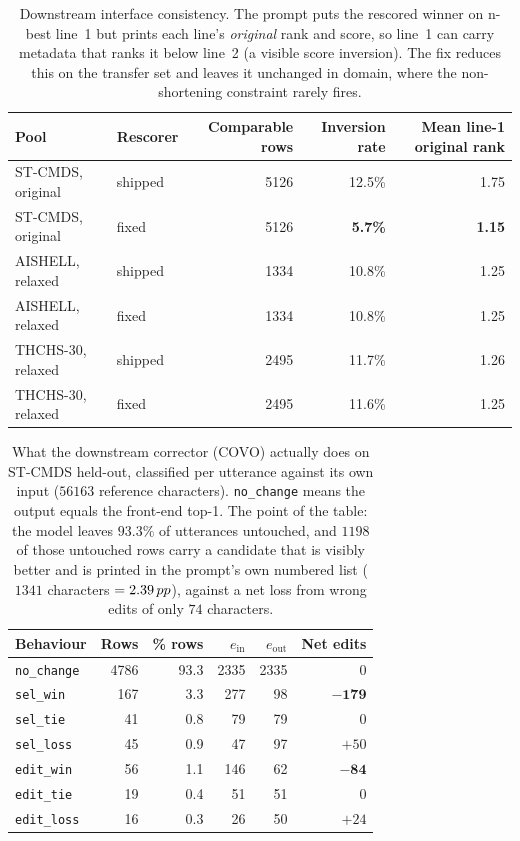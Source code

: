 \begin{table}[t]
\centering
\caption{Downstream interface consistency. The prompt puts the rescored winner
on n-best line~1 but prints each line's \emph{original} rank and score, so line~1
can carry metadata that ranks it below line~2 (a visible score inversion).
The fix reduces this on the transfer set and leaves it unchanged in domain,
where the non-shortening constraint rarely fires.}
\label{tab:interface}
\begin{tabular}{llrrr}
\toprule
Pool & Rescorer & Comparable rows & Inversion rate & Mean line-1 original rank \\
\midrule
ST-CMDS, original & shipped & 5126 & 12.5\% & 1.75 \\
ST-CMDS, original & fixed   & 5126 & \textbf{5.7\%} & \textbf{1.15} \\
AISHELL, relaxed  & shipped & 1334 & 10.8\% & 1.25 \\
AISHELL, relaxed  & fixed   & 1334 & 10.8\% & 1.25 \\
THCHS-30, relaxed & shipped & 2495 & 11.7\% & 1.26 \\
THCHS-30, relaxed & fixed   & 2495 & 11.6\% & 1.25 \\
\bottomrule
\end{tabular}
\end{table}

\begin{table}[t]
\centering
\caption{What the downstream corrector (COVO) actually does on ST-CMDS held-out,
classified per utterance against its own input ($56163$ reference characters).
\texttt{no\_change} means the output equals the front-end top-1.
The point of the table: the model leaves $93.3\%$ of utterances untouched, and
$1198$ of those untouched rows carry a candidate that is visibly better and is
printed in the prompt's own numbered list ($1341$ characters $= 2.39\,pp$),
against a net loss from wrong edits of only $74$ characters.}
\label{tab:backend-behaviour}
\begin{tabular}{lrrrrr}
\toprule
Behaviour & Rows & \% rows & $e_{\text{in}}$ & $e_{\text{out}}$ & Net edits \\
\midrule
\texttt{no\_change}            & 4786 & 93.3 & 2335 & 2335 & 0 \\
\texttt{sel\_win}              & 167  & 3.3  & 277  & 98   & $\mathbf{-179}$ \\
\texttt{sel\_tie}              & 41   & 0.8  & 79   & 79   & 0 \\
\texttt{sel\_loss}             & 45   & 0.9  & 47   & 97   & $+50$ \\
\texttt{edit\_win}             & 56   & 1.1  & 146  & 62   & $\mathbf{-84}$ \\
\texttt{edit\_tie}             & 19   & 0.4  & 51   & 51   & 0 \\
\texttt{edit\_loss}            & 16   & 0.3  & 26   & 50   & $+24$ \\
\bottomrule
\end{tabular}
\end{table}

